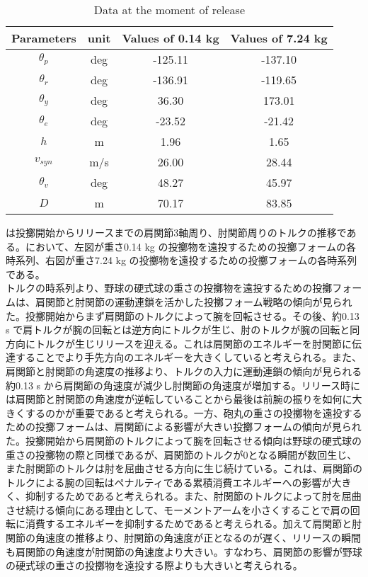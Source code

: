 \begin{table}[tb]
  \begin{center}
    \caption{Data at the moment of release}

    \begin{tabular}{c c c c}
      \hline
      Parameters & unit & Values of 0.14 kg & Values of 7.24 kg \\
      \hline
      $\theta_{p}$ & deg & -125.11 & -137.10 \\
      $\theta_{r}$ & deg & -136.91 & -119.65 \\
      $\theta_{y}$ & deg  & 36.30 & 173.01 \\
      $\theta_{e}$ & deg & -23.52 & -21.42 \\
      $h$ & m & 1.96 & 1.65 \\
      $v_{syn}$ & m/s & 26.00 & 28.44 \\
      $\theta_{v}$ & deg & 48.27 & 45.97 \\
      $D$ & m & 70.17 & 83.85 \\
      \hline
    \end{tabular}
  \end{center}
\end{table}

は投擲開始からリリースまでの肩関節3軸周り、肘関節周りのトルクの推移である。において、左図が重さ0.14 kg の投擲物を遠投するための投擲フォームの各時系列、右図が重さ7.24 kg の投擲物を遠投するための投擲フォームの各時系列である。\\
トルクの時系列より、野球の硬式球の重さの投擲物を遠投するための投擲フォームは、肩関節と肘関節の運動連鎖を活かした投擲フォーム戦略の傾向が見られた。投擲開始からまず肩関節のトルクによって腕を回転させる。その後、約0.13 s で肩トルクが腕の回転とは逆方向にトルクが生じ、肘のトルクが腕の回転と同方向にトルクが生じリリースを迎える。これは肩関節のエネルギーを肘関節に伝達することでより手先方向のエネルギーを大きくしていると考えられる。また、肩関節と肘関節の角速度の推移より、トルクの入力に運動連鎖の傾向が見られる約0.13 s から肩関節の角速度が減少し肘関節の角速度が増加する。リリース時には肩関節と肘関節の角速度が逆転していることから最後は前腕の振りを如何に大きくするのかが重要であると考えられる。一方、砲丸の重さの投擲物を遠投するための投擲フォームは、肩関節による影響が大きい投擲フォームの傾向が見られた。投擲開始から肩関節のトルクによって腕を回転させる傾向は野球の硬式球の重さの投擲物の際と同様であるが、肩関節のトルクが0となる瞬間が数回生じ、また肘関節のトルクは肘を屈曲させる方向に生じ続けている。これは、肩関節のトルクによる腕の回転はペナルティである累積消費エネルギーへの影響が大きく、抑制するためであると考えられる。また、肘関節のトルクによって肘を屈曲させ続ける傾向にある理由として、モーメントアームを小さくすることで肩の回転に消費するエネルギーを抑制するためであると考えられる。加えて肩関節と肘関節の角速度の推移より、肘関節の角速度が正となるのが遅く、リリースの瞬間も肩関節の角速度が肘関節の角速度より大きい。すなわち、肩関節の影響が野球の硬式球の重さの投擲物を遠投する際よりも大きいと考えられる。\\

